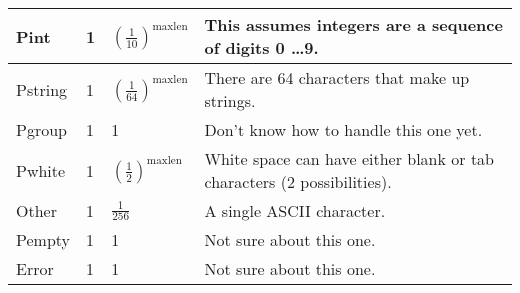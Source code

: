\begin{longtable}{||l|l|l|l|}
\textsf{Pint} & 1 & $\left(\frac{1}{10}\right)^\mathrm{maxlen}$ &
\parbox[t]{5cm}{
This assumes integers are a sequence of digits 0 \ldots 9.
\vspace{0.5mm}} \\\hline

\textsf{Pstring} & 1 & $\left(\frac{1}{64}\right)^\mathrm{maxlen}$ &
\parbox[t]{5cm}{
There are 64 characters that make up strings.
\vspace{0.5mm}} \\\hline

\textsf{Pgroup} & 1 & 1 &
\parbox[t]{5cm}{
Don't know how to handle this one yet.
\vspace{0.5mm}} \\\hline

\textsf{Pwhite} & 1 & $\left(\frac{1}{2}\right)^\mathrm{maxlen}$ &
\parbox[t]{5cm}{
White space can have either blank or tab characters (2 possibilities).
\vspace{0.5mm}} \\\hline

\textsf{Other} & 1 & $\frac{1}{256}$ &
\parbox[t]{5cm}{
A single ASCII character.
\vspace{0.5mm}} \\\hline

\textsf{Pempty} & 1 & 1 &
\parbox[t]{5cm}{
Not sure about this one.
\vspace{0.5mm}} \\\hline

\textsf{Error} & 1 & 1 &
\parbox[t]{5cm}{
Not sure about this one.
\vspace{0.5mm}} \\\hline

\end{longtable}

